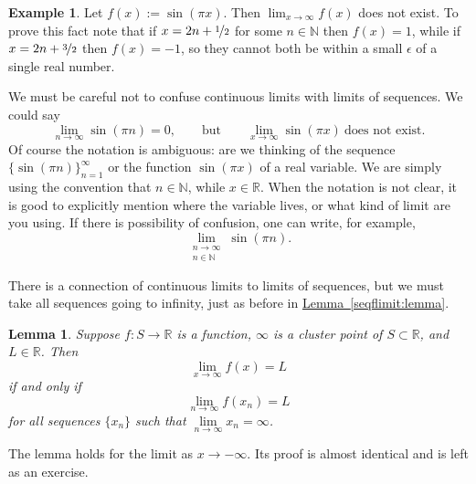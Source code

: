 \documentclass[12pt]{book}
\newcommand{\R}{{\mathbb{R}}}
\newcommand{\N}{{\mathbb{N}}}
\theoremstyle{plain}
\newtheorem{lemma}[thm]{Lemma}
\theoremstyle{remark}
\theoremstyle{definition}
\theoremstyle{exercise}
\theoremstyle{example}
\newtheorem{example}[thm]{Example}
\newcommand{\lemmaref}[1]{\hyperref[#1]{Lemma~\ref*{#1}}}
\begin{document}
\begin{example}
Let $f(x) := \sin(\pi x)$.  Then $\lim_{x\to\infty} f(x)$ does not exist.
To prove this fact note that if $x = 2n+\nicefrac{1}{2}$ for some $n \in \N$ then $f(x)=1$,
while if $x = 2n+\nicefrac{3}{2}$ then $f(x)=-1$, so they cannot both be
within a small $\epsilon$ of a single real number.

We must be careful not to confuse continuous limits with limits of sequences.
We could say
\begin{equation*}
\lim_{n \to \infty} \sin(\pi n) = 0, \qquad \text{but} \qquad
\lim_{x \to \infty} \sin(\pi x) ~ \text{does not exist}.
\end{equation*}
Of course the notation is ambiguous: are we thinking of the
sequence $\{ \sin (\pi n) \}_{n=1}^\infty$ or the function $\sin(\pi x)$
of a real variable.  We are simply using the convention
that $n \in \N$, while $x \in \R$.  When the notation is not clear,
it is good to explicitly mention where the variable lives, or what kind
of limit are you using.  If there is possibility of confusion, one can
write, for example,
\begin{equation*}
\lim_{\substack{n \to \infty\\n \in \N}} \sin(\pi n) .
\end{equation*}
\end{example}

There is a connection of continuous limits to limits of sequences, but we must take all
sequences going to infinity, just as before in \lemmaref{seqflimit:lemma}.

\begin{lemma} \label{seqflimitinf:lemma}
Suppose $f \colon S \to \R$ is a function, $\infty$ is a cluster
point of $S \subset \R$, and $L \in \R$.  Then
\begin{equation*}
\lim_{x\to\infty} f(x) = L
\end{equation*}
if and only if
\begin{equation*}
\lim_{n\to\infty} f(x_n) = L%
\end{equation*}
for all sequences $\{ x_n \}$ such that $\lim\limits_{n\to\infty} x_n = \infty$.
\end{lemma}

The lemma holds for the limit as $x \to -\infty$.
Its proof is almost identical and
is left as an exercise.
\end{document}
